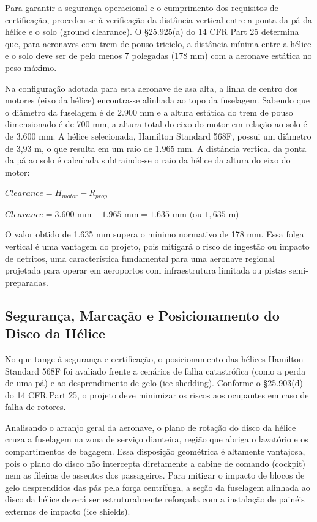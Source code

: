 Para garantir a segurança operacional e o cumprimento dos requisitos de certificação, procedeu-se à verificação da distância vertical entre a ponta da pá da hélice e o solo (ground clearance). O \S 25.925(a) do 14 CFR Part 25 determina que, para aeronaves com trem de pouso triciclo, a distância mínima entre a hélice e o solo deve ser de pelo menos 7 polegadas (178 mm) com a aeronave estática no peso máximo.  

Na configuração adotada para esta aeronave de asa alta, a linha de centro dos motores (eixo da hélice) encontra-se alinhada ao topo da fuselagem. Sabendo que o diâmetro da fuselagem é de 2.900 mm e a altura estática do trem de pouso dimensionado é de 700 mm, a altura total do eixo do motor em relação ao solo é de 3.600 mm.  A hélice selecionada, Hamilton Standard 568F, possui um diâmetro de 3,93 m, o que resulta em um raio de 1.965 mm. A distância vertical da ponta da pá ao solo é calculada subtraindo-se o raio da hélice da altura do eixo do motor: 

$Clearance = H_{motor} - R_{prop}$

$Clearance = 3.600 \text{ mm} - 1.965 \text{ mm} = 1.635 \text{ mm} \text{ (ou } 1,635 \text{ m)}$

O valor obtido de 1.635 mm supera o mínimo normativo de 178 mm. Essa folga vertical é uma vantagem do projeto, pois mitigará o risco de ingestão ou impacto de detritos, uma característica fundamental para uma aeronave regional projetada para operar em aeroportos com infraestrutura limitada ou pistas semi-preparadas.

\subsection{Segurança, Marcação e Posicionamento do Disco da Hélice}
\label{sec:seguranca_helice}

No que tange à segurança e certificação, o posicionamento das hélices Hamilton Standard 568F foi avaliado frente a cenários de falha catastrófica (como a perda de uma pá) e ao desprendimento de gelo (ice shedding). Conforme o \S 25.903(d) do 14 CFR Part 25, o projeto deve minimizar os riscos aos ocupantes em caso de falha de rotores.

Analisando o arranjo geral da aeronave, o plano de rotação do disco da hélice cruza a fuselagem na zona de serviço dianteira, região que abriga o lavatório e os compartimentos de bagagem. Essa disposição geométrica é altamente vantajosa, pois o plano do disco não intercepta diretamente a cabine de comando (cockpit) nem as fileiras de assentos dos passageiros. Para mitigar o impacto de blocos de gelo desprendidos das pás pela força centrífuga, a seção da fuselagem alinhada ao disco da hélice deverá ser estruturalmente reforçada com a instalação de painéis externos de impacto (ice shields).

